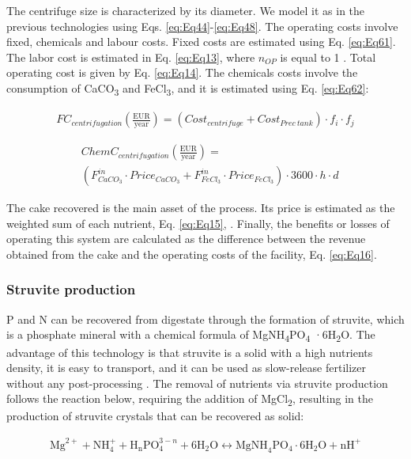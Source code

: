 \begin{refsection}[referencesCh2]
The centrifuge size is characterized by its diameter. We model it as in the previous technologies using Eqs. \ref{eq:Eq44}-\ref{eq:Eq48}. The operating costs involve fixed, chemicals and labour costs. Fixed costs are estimated using Eq. \ref{eq:Eq61}. The labor cost is estimated in Eq. \ref{eq:Eq13}, where $n_{OP}$ is equal to 1 \citep{vian1975pronostico}. Total operating cost is given by Eq. \ref{eq:Eq14}. The chemicals costs involve the consumption of CaCO\textsubscript{3} and FeCl\textsubscript{3}, and it is estimated using Eq. \ref{eq:Eq62}:

\begin{align}
	{FC}_{centrifugation} \left( \frac{\text{EUR}}{\text{year}} \right) = \left( {Cost_{centrifuge}} + {Cost}_{Prec \ tank} \right) \cdot {f_i} \cdot {f_j} \label{eq:Eq61}
\end{align}

\begin{align}
	& {ChemC}_{centrifugation} \left( \frac{\text{EUR}}{\text{year}} \right) = \label{eq:Eq62} \\
	& \left( F_{CaCO_{3}}^{in} \cdot {Price}_{CaCO_{3}} + F_{FeCl_{3}}^{in} \cdot {Price}_{FeCl_{3}} \right) \cdot 3600 \cdot h \cdot d \nonumber
\end{align}

The cake recovered is the main asset of the process. Its price is estimated as the weighted sum of each nutrient, Eq. \ref{eq:Eq15}, \citep{hernandez2017bio}. Finally, the benefits or losses of operating this system are calculated as the difference between the revenue obtained from the cake and the operating costs of the facility, Eq. \ref{eq:Eq16}.

\subsubsection{Struvite production}
P and N can be recovered from digestate through the formation of struvite, which is a phosphate mineral with a chemical formula of MgNH\textsubscript{4}PO\textsubscript{4} ·6H\textsubscript{2}O. The advantage of this technology is that struvite is a solid with a high nutrients density, it is easy to transport, and it can be used as slow-release fertilizer without any post-processing \citep{doyle2002struvite}. The removal of nutrients via struvite production follows the reaction below, requiring the addition of MgCl\textsubscript{2}, resulting in the production of struvite crystals that can be recovered as solid:

\begin{align}
	\text{Mg}^{2+} + \text{NH}_4^{+}  + \text{H}_{\text{n}}\text{PO}_4^{3-n} + 6\text{H}_{2}\text{O} \leftrightarrow \text{MgNH}_{4}\text{PO}_{4} \cdot 6\text{H}_{2}\text{O} + \text{nH}^{+} \label{eq:Eq63}
\end{align}


\end{refsection}
